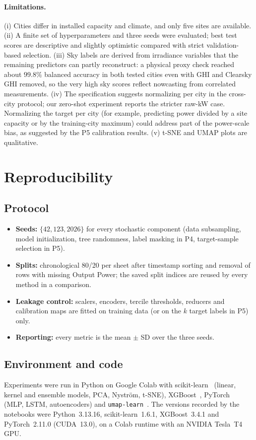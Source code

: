 \documentclass[11pt,letterpaper]{article}
\begin{document}
\paragraph{Limitations.}
(i) Cities differ in installed capacity and climate, and only five sites are available.
(ii) A finite set of hyperparameters and three seeds were evaluated; best test scores are
descriptive and slightly optimistic compared with strict validation-based selection.
(iii) Sky labels are derived from irradiance variables that the remaining predictors can partly
reconstruct: a physical proxy check reached about $99.8\%$ balanced accuracy in both tested
cities even with GHI and Clearsky GHI removed, so the very high sky scores reflect nowcasting from
correlated measurements.
(iv) The specification suggests normalizing per city in the cross-city protocol;
our zero-shot experiment reports the stricter raw-kW case. Normalizing the target per city (for
example, predicting power divided by a site capacity or by the training-city maximum) could address part of the power-scale bias, as suggested by the P5
calibration results.
(v) t-SNE and UMAP plots are qualitative.

\section{Reproducibility}
\subsection{Protocol}
\begin{itemize}[leftmargin=1.5em,itemsep=2pt]
\item \textbf{Seeds:} $\{42,123,2026\}$ for every stochastic component (data subsampling, model
initialization, tree randomness, label masking in P4, target-sample selection in P5).
\item \textbf{Splits:} chronological 80/20 per sheet after timestamp sorting and removal of rows with
missing Output Power; the saved split indices are reused by every method in a comparison.
\item \textbf{Leakage control:} scalers, encoders, tercile thresholds, reducers and calibration maps
are fitted on training data (or on the $k$ target labels in P5) only.
\item \textbf{Reporting:} every metric is the mean $\pm$ SD over the three seeds.
\end{itemize}

\subsection{Environment and code}
Experiments were run in Python on Google Colab with scikit-learn~\cite{sklearn} (linear, kernel
and ensemble models, PCA, Nystr\"om, t-SNE), XGBoost~\cite{xgboost}, PyTorch~\cite{pytorch}
(MLP, LSTM, autoencoders) and \texttt{umap-learn}~\cite{umap}. The versions recorded by the
notebooks were Python~3.13.16, scikit-learn~1.6.1, XGBoost~3.4.1 and PyTorch~2.11.0 (CUDA~13.0),
on a Colab runtime with an NVIDIA Tesla~T4 GPU.
\end{document}
